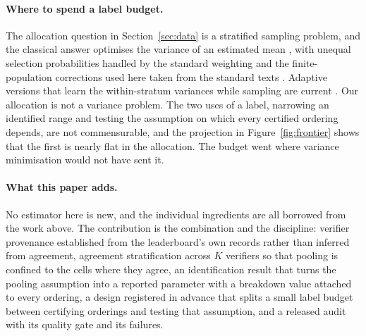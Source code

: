 \paragraph{Where to spend a label budget.}
The allocation question in Section~\ref{sec:data} is a stratified sampling problem, and the
classical answer optimises the variance of an estimated mean \citep{neyman1934stratified},
with unequal selection probabilities handled by the standard weighting
\citep{horvitz1952generalization} and the finite-population corrections used here taken from
the standard texts \citep{cochran1977sampling, kish1965survey}. Adaptive versions that learn
the within-stratum variances while sampling are current \citep{morikawa2026tsneyman}. Our
allocation is not a variance problem. The two uses of a label, narrowing an identified range
and testing the assumption on which every certified ordering depends, are not commensurable,
and the projection in Figure~\ref{fig:frontier} shows that the first is nearly flat in the
allocation. The budget went where variance minimisation would not have sent it.

\paragraph{What this paper adds.}
No estimator here is new, and the individual ingredients are all borrowed from the work above.
The contribution is the combination and the discipline: verifier provenance established from
the leaderboard's own records rather than inferred from agreement, agreement stratification
across $K$ verifiers so that pooling is confined to the cells where they agree, an
identification result that turns the pooling assumption into a reported parameter with a
breakdown value attached to every ordering, a design registered in advance that splits a small
label budget between certifying orderings and testing that assumption, and a released audit
with its quality gate and its failures.
